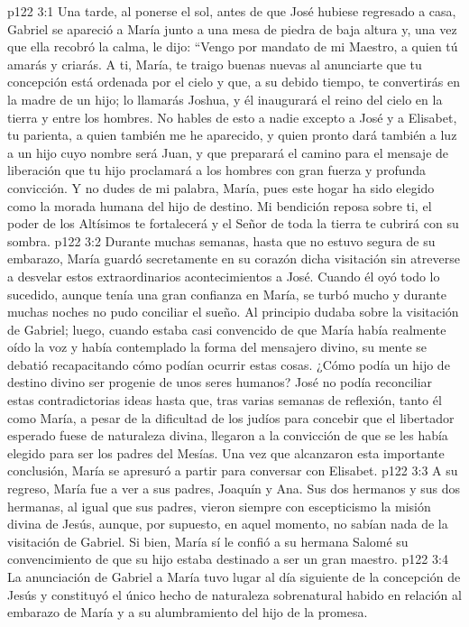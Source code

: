 \vs p122 3:1 Una tarde, al ponerse el sol, antes de que José hubiese regresado a casa, Gabriel se apareció a María junto a una mesa de piedra de baja altura y, una vez que ella recobró la calma, le dijo: “Vengo por mandato de mi Maestro, a quien tú amarás y criarás. A ti, María, te traigo buenas nuevas al anunciarte que tu concepción está ordenada por el cielo y que, a su debido tiempo, te convertirás en la madre de un hijo; lo llamarás Joshua, y él inaugurará el reino del cielo en la tierra y entre los hombres. No hables de esto a nadie excepto a José y a Elisabet, tu parienta, a quien también me he aparecido, y quien pronto dará también a luz a un hijo cuyo nombre será Juan, y que preparará el camino para el mensaje de liberación que tu hijo proclamará a los hombres con gran fuerza y profunda convicción. Y no dudes de mi palabra, María, pues este hogar ha sido elegido como la morada humana del hijo de destino. Mi bendición reposa sobre ti, el poder de los Altísimos te fortalecerá y el Señor de toda la tierra te cubrirá con su sombra.
\vs p122 3:2 \pc Durante muchas semanas, hasta que no estuvo segura de su embarazo, María guardó secretamente en su corazón dicha visitación sin atreverse a desvelar estos extraordinarios acontecimientos a José. Cuando él oyó todo lo sucedido, aunque tenía una gran confianza en María, se turbó mucho y durante muchas noches no pudo conciliar el sueño. Al principio dudaba sobre la visitación de Gabriel; luego, cuando estaba casi convencido de que María había realmente oído la voz y había contemplado la forma del mensajero divino, su mente se debatió recapacitando cómo podían ocurrir estas cosas. ¿Cómo podía un hijo de destino divino ser progenie de unos seres humanos? José no podía reconciliar estas contradictorias ideas hasta que, tras varias semanas de reflexión, tanto él como María, a pesar de la dificultad de los judíos para concebir que el libertador esperado fuese de naturaleza divina, llegaron a la convicción de que se les había elegido para ser los padres del Mesías. Una vez que alcanzaron esta importante conclusión, María se apresuró a partir para conversar con Elisabet.
\vs p122 3:3 A su regreso, María fue a ver a sus padres, Joaquín y Ana. Sus dos hermanos y sus dos hermanas, al igual que sus padres, vieron siempre con escepticismo la misión divina de Jesús, aunque, por supuesto, en aquel momento, no sabían nada de la visitación de Gabriel. Si bien, María sí le confió a su hermana Salomé su convencimiento de que su hijo estaba destinado a ser un gran maestro.
\vs p122 3:4 \pc La anunciación de Gabriel a María tuvo lugar al día siguiente de la concepción de Jesús y constituyó el único hecho de naturaleza sobrenatural habido en relación al embarazo de María y a su alumbramiento del hijo de la promesa.
